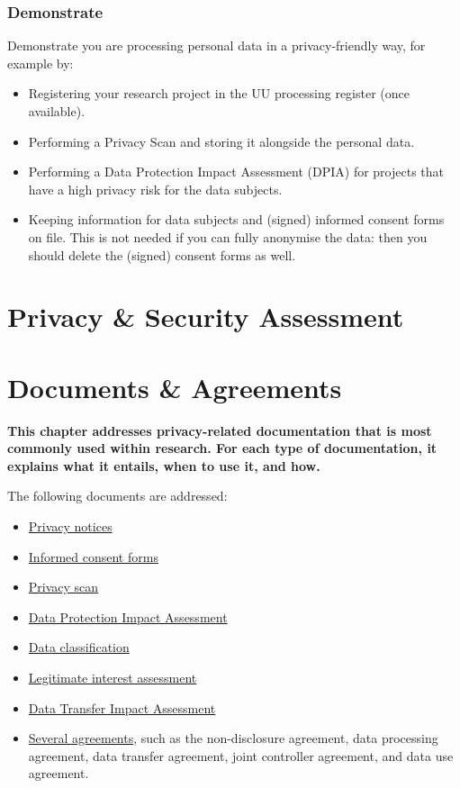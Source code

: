 \documentclass[
]{book}
\providecommand{\tightlist}{%
  \setlength{\itemsep}{0pt}\setlength{\parskip}{0pt}}
\begin{document}
\hypertarget{demonstrate}{%
\subsection{Demonstrate}\label{demonstrate}}

Demonstrate you are processing personal data in a privacy-friendly way, for
example by:

\begin{itemize}
\tightlist
\item
  Registering your research project in the UU processing register (once available).
\item
  Performing a Privacy Scan and storing it
  alongside the personal data.
\item
  Performing a Data Protection Impact Assessment (DPIA) for
  projects that have a high privacy risk for the data subjects.
\item
  Keeping information for data subjects and (signed) informed consent forms on
  file. This is not needed if you can fully anonymise the data: then you should
  delete the (signed) consent forms as well.
\end{itemize}

\hypertarget{risk-assessment}{%
\chapter{Privacy \& Security Assessment}\label{risk-assessment}}

\hypertarget{legal-documents}{%
\chapter{Documents \& Agreements}\label{legal-documents}}

\textbf{This chapter addresses privacy-related documentation that is most commonly used
within research. For each type of documentation, it explains what it entails,
when to use it, and how.}

The following documents are addressed:

\begin{itemize}
\tightlist
\item
  \protect\hyperlink{privacy-notices}{Privacy notices}
\item
  \protect\hyperlink{informed-consent-forms}{Informed consent forms}
\item
  \protect\hyperlink{privacy-scan}{Privacy scan}
\item
  \protect\hyperlink{dpia}{Data Protection Impact Assessment}
\item
  \protect\hyperlink{data-classification}{Data classification}
\item
  \protect\hyperlink{legitimate-interest-assessment}{Legitimate interest assessment}
\item
  \protect\hyperlink{dtia}{Data Transfer Impact Assessment}
\item
  \protect\hyperlink{agreements}{Several agreements}, such as the non-disclosure agreement, data processing
  agreement, data transfer agreement, joint controller agreement, and data use
  agreement.
\end{itemize}
\end{document}

